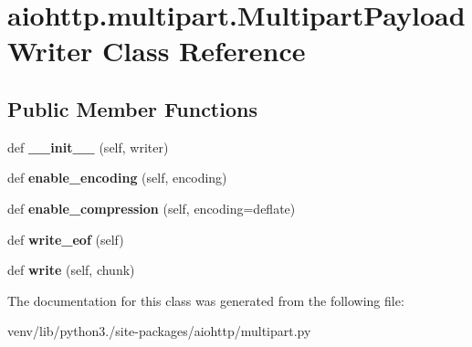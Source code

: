 \hypertarget{classaiohttp_1_1multipart_1_1_multipart_payload_writer}{}\section{aiohttp.\+multipart.\+Multipart\+Payload\+Writer Class Reference}
\label{classaiohttp_1_1multipart_1_1_multipart_payload_writer}
\subsection*{Public Member Functions}
\begin{DoxyCompactItemize}
\item 
\mbox{\label{classaiohttp_1_1multipart_1_1_multipart_payload_writer_ac33f7eb430d1b016b5857d4b04f39d0a}} 
def {\bfseries \+\_\+\+\_\+init\+\_\+\+\_\+} (self, writer)
\item 
\mbox{\label{classaiohttp_1_1multipart_1_1_multipart_payload_writer_a8382f62c6d3aaf67780bc1c387b7c15c}} 
def {\bfseries enable\+\_\+encoding} (self, encoding)
\item 
\mbox{\label{classaiohttp_1_1multipart_1_1_multipart_payload_writer_a2baf0aada4cc2c0d67ef4b756d544994}} 
def {\bfseries enable\+\_\+compression} (self, encoding=\textquotesingle{}deflate\textquotesingle{})
\item 
\mbox{\label{classaiohttp_1_1multipart_1_1_multipart_payload_writer_a29179571f5a37d2edecd3edf7febe9bc}} 
def {\bfseries write\+\_\+eof} (self)
\item 
\mbox{\label{classaiohttp_1_1multipart_1_1_multipart_payload_writer_a291a818437d478aa9068f08556e91dba}} 
def {\bfseries write} (self, chunk)
\end{DoxyCompactItemize}


The documentation for this class was generated from the following file\+:\begin{DoxyCompactItemize}
\item 
venv/lib/python3./site-\/packages/aiohttp/multipart.\+py\end{DoxyCompactItemize}
